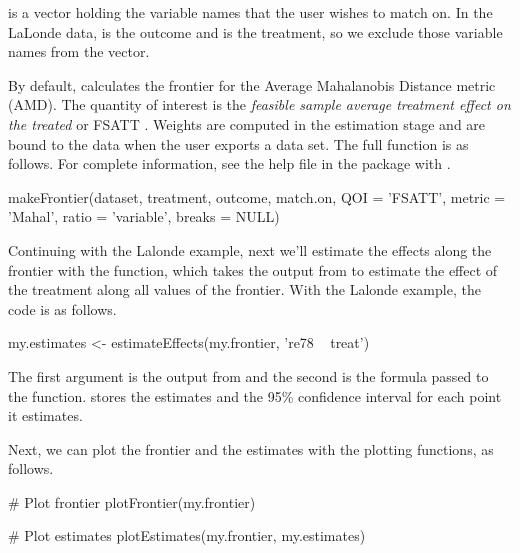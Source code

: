\documentclass[nojss]{jss}
\begin{document}
 is a vector holding the variable names that the user
wishes to match on. In the LaLonde data,  is the outcome
and  is the treatment, so we exclude those variable names
from the vector.

By default,  calculates the frontier for the
Average Mahalanobis Distance metric (AMD). The quantity of interest is
the \emph{feasible sample average treatment effect on the treated} or
FSATT \citep{kingND}. Weights are computed in the estimation stage and
are bound to the data when the user exports a data set. The full
function is as follows. For complete information, see the help file
in the package with .

\begin{CodeChunk}
\begin{CodeInput}
  makeFrontier(dataset, 
              treatment, 
              outcome, 
              match.on, 
              QOI = 'FSATT',
              metric = 'Mahal', 
              ratio = 'variable', 
              breaks = NULL)
\end{CodeInput}
\end{CodeChunk}

Continuing with the Lalonde example, next we'll estimate the effects
along the frontier with the  function, which
takes the output from  to estimate the effect of
the treatment along all values of the frontier. With the Lalonde
example, the code is as follows.

\begin{CodeChunk}
\begin{CodeInput}
my.estimates <- estimateEffects(my.frontier, 
                             're78 ~ treat')
\end{CodeInput}
\end{CodeChunk}

The first argument is the output from  and the
second is the formula passed to the 
function.  stores the estimates and the 95\%
confidence interval for each point it estimates.

Next, we can plot the frontier and the estimates with the plotting
functions, as follows. 

\begin{CodeChunk}
\begin{CodeInput}
# Plot frontier
plotFrontier(my.frontier)

# Plot estimates
plotEstimates(my.frontier, my.estimates)
\end{CodeInput}
\end{CodeChunk}
\end{document}
